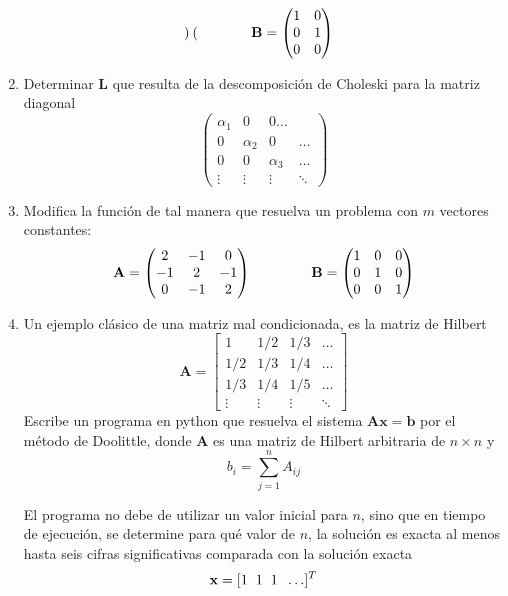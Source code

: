 \begin{enumerate}
\[\begin{pmatrix}
	\end{pmatrix} \hspace{1.5cm}
	\mathbf{B} =	
	\begin{pmatrix}
		1 & 0 \\
		0 & 1 \\
		0 & 0 
	\end{pmatrix} \]
\item Determinar $\mathbf{L}$ que resulta de la descomposición de Choleski para la matriz diagonal
\[ \begin{pmatrix}
		\alpha_{1} & 0 & 0 \ldots \\
		0 & \alpha_{2} & 0 & \ldots \\
		0 & 0 & \alpha_{3} & \ldots \\
		\vdots & \vdots &\vdots & \ddots
\end{pmatrix} \]
\item Modifica la función  de tal manera que resuelva un problema con $m$ vectores constantes:
\[ \mathbf{A} = \begin{pmatrix}
2 & -1 & 0 \\
-1 & 2 & -1 \\
0 & -1 & 2
\end{pmatrix}
\hspace{1.5cm}
\mathbf{B} = \begin{pmatrix}
1 & 0 & 0 \\
0 & 1 & 0 \\
0 & 0 & 1
\end{pmatrix}
 \]
\item Un ejemplo clásico de una matriz mal condicionada, es la matriz de Hilbert
\[ \mathbf{A} = 
	\begin{bmatrix}
		1 & 1/2 & 1/3 & \ldots \\
		1/2 & 1/3 & 1/4 & \ldots \\
		1/3 & 1/4 & 1/5 & \ldots \\
		\vdots & \vdots & \vdots & \ddots
	\end{bmatrix} \]
Escribe un programa en python que resuelva el sistema $\mathbf{A}\mathbf{x} = \mathbf{b}$ por el método de Doolittle, donde $\mathbf{A}$ es una matriz de Hilbert arbitraria de $n \times n$ y \[ b_{i} = \sum_{j=1}^{n} A_{ij} \]
\par
El programa no debe de utilizar un valor inicial para $n$, sino que en tiempo de ejecución, se determine para qué valor de $n$, la solución es exacta al menos hasta seis cifras significativas comparada con la solución exacta
\[\mathbf{x} = [1 \hspace{0.2cm} 1 \hspace{0.2cm} 1 \hspace{0.2cm} \ldots ]^{T} \]

\end{enumerate}
